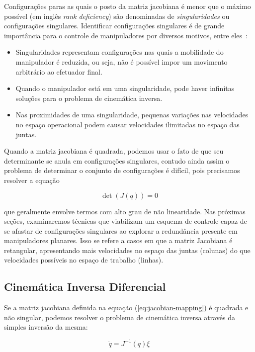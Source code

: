 Configurações paras as quais o posto da matriz jacobiana é menor que o máximo
possível (em inglês \emph{rank deficiency}) são denominadas de
\emph{singularidades} ou configurações singulares. Identificar configurações
singulares é de grande importância para o controle de manipuladores por
diversos motivos, entre eles~\cite{spong_robot_2020}:

\begin{itemize}
    \item Singularidades representam configurações nas quais a mobilidade do manipulador
          é reduzida, ou seja, não é possível impor um movimento arbitrário ao efetuador
          final.
    \item Quando o manipulador está em uma singularidade, pode haver infinitas soluções
          para o problema de cinemática inversa.
    \item Nas proximidades de uma singularidade, pequenas variações nas velocidades no
          espaço operacional podem causar velocidades ilimitadas no espaço das juntas.
\end{itemize}

Quando a matriz jacobiana é quadrada, podemos usar o fato de que seu
determinante se anula em configurações singulares, contudo ainda assim o
problema de determinar o conjunto de configurações é difícil, pois precisamos
resolver a equação

\begin{equation}
    \det(J(q)) = 0
\end{equation}

que geralmente envolve termos com alto grau de não linearidade. Nas próximas
seções, examinaremos técnicas que viabilizam um esquema de controle capaz de se
afastar de configurações singulares ao explorar a redundância presente em
manipuladores planares. Isso se refere a casos em que a matriz Jacobiana é
retangular, apresentando mais velocidades no espaço das juntas (colunas) do que
velocidades possíveis no espaço de trabalho (linhas).

\subsection{Cinemática Inversa Diferencial}

Se a matriz jacobiana definida na equação (\ref{eq:jacobian-mapping}) é
quadrada e não singular, podemos resolver o problema de cinemática inversa
através da simples inversão da mesma:

\begin{equation}\label{eq:resolved-rate}
    \dot{q} = J^{-1}(q) \xi
\end{equation}

